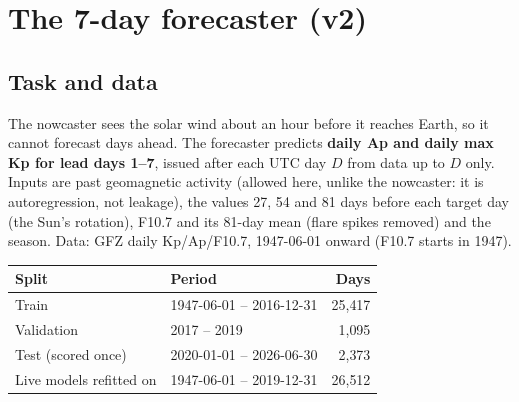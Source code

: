 \documentclass[11pt,a4paper]{article}
\begin{document}
\section{The 7-day forecaster (v2)}

\subsection{Task and data}
The nowcaster sees the solar wind about an hour before it reaches Earth, so it cannot forecast days ahead. The
forecaster predicts \textbf{daily Ap and daily max Kp for lead days 1--7}, issued after each UTC day $D$ from data up
to $D$ only. Inputs are past geomagnetic activity (allowed here, unlike the nowcaster: it is autoregression, not
leakage), the values 27, 54 and 81 days before each target day (the Sun's rotation), F10.7 and its 81-day mean
(flare spikes removed) and the season. Data: GFZ daily Kp/Ap/F10.7, 1947-06-01 onward (F10.7 starts in 1947).

\begin{center}
\begin{tabular}{llr}
\toprule
Split & Period & Days\\
\midrule
Train & 1947-06-01 -- 2016-12-31 & 25{,}417\\
Validation & 2017 -- 2019 & 1{,}095\\
Test (scored once) & 2020-01-01 -- 2026-06-30 & 2{,}373\\
Live models refitted on & 1947-06-01 -- 2019-12-31 & 26{,}512\\
\bottomrule
\end{tabular}
\end{center}
\end{document}
